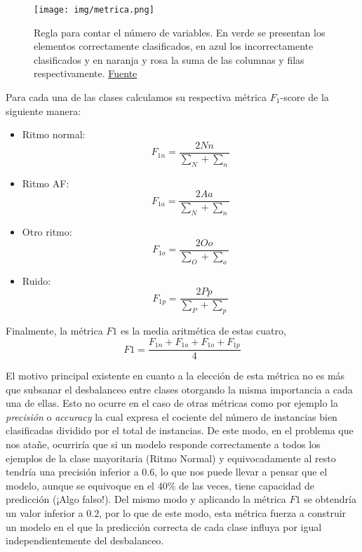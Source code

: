     \begin{figure}[H]
        \centering
        \texttt{[image: img/metrica.png]}
        \caption{Regla para contar el número de variables. En verde se presentan los elementos correctamente clasificados, en azul los incorrectamente clasificados y en naranja y rosa la suma de las columnas y filas respectivamente. \href{https://physionet.org/files/challenge-2017/1.0.0/table3.png}{Fuente}}
        \label{fig:metrica}
    \end{figure}
    
    Para cada una de las clases calculamos su respectiva métrica $F_1$-score de la siguiente manera:
    
    \begin{itemize}
        \item Ritmo normal:
        \begin{equation}
            F_{1n} = \frac{2 Nn}{\sum_{N} + \sum_{n}}
        \end{equation}
        \item Ritmo AF:
        \begin{equation}
            F_{1a} = \frac{2 Aa}{\sum_{N} + \sum_{n}}
        \end{equation}
        \item Otro ritmo:
        \begin{equation}
            F_{1o} = \frac{2 Oo}{\sum_{O} + \sum_{o}}
        \end{equation}
        \item Ruido:
        \begin{equation}
            F_{1p} = \frac{2 Pp}{\sum_{P} + \sum_{p}}
        \end{equation}
    \end{itemize}
    
    \noindent Finalmente, la métrica $F1$ es la media aritmética de estas cuatro,
    \begin{equation}
        F1 = \frac{F_{1n} + F_{1a} + F_{1o} + F_{1p}}{4}
    \end{equation}
    
    El motivo principal existente en cuanto a la elección de esta métrica no es más que subsanar el desbalanceo entre clases otorgando la misma importancia a cada una de ellas. Esto no ocurre en el caso de otras métricas como por ejemplo la \textit{precisión} o \textit{accuracy} la cual expresa el cociente del número de instancias bien clasificadas dividido por el total de instancias. De este modo, en el problema que nos atañe, ocurriría que si un modelo responde correctamente a todos los ejemplos de la clase mayoritaria (Ritmo Normal) y equivocadamente al resto tendría una precisión inferior a $0.6$, lo que nos puede llevar a pensar que el modelo, aunque se equivoque en el $40\%$ de las veces, tiene capacidad de predicción (¡Algo falso!). Del mismo modo y aplicando la métrica $F1$ se obtendría un valor inferior a $0.2$, por lo que de este modo, esta métrica fuerza a construir un modelo en el que la predicción correcta de cada clase influya por igual independientemente del desbalanceo. \\
    
